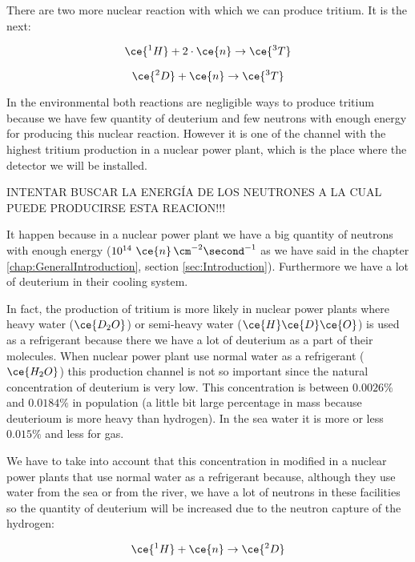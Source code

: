 There are two more nuclear reaction with which we can produce tritium. It is the next:

\begin{equation}
\ce{^{1}H} + 2 \cdot{} \ce{n} \rightarrow \ce{^{3}T}
\label{doblecapneuH}
\end{equation}

\begin{equation}
\ce{^{2}D} + \ce{n} \rightarrow \ce{^{3}T}
\label{capneuD}
\end{equation}

In the environmental both reactions are negligible ways to produce tritium because we have few quantity of deuterium and few neutrons with enough energy for producing this nuclear reaction. However it is one of the channel with the highest tritium production in a nuclear power plant, which is the place where the detector we will be installed.

INTENTAR BUSCAR LA ENERGÍA DE LOS NEUTRONES A LA CUAL PUEDE PRODUCIRSE ESTA REACION!!!

It happen because in a nuclear power plant we have a big quantity of neutrons with enough energy ($10^{14} ~\ce{n} \, \cm^{-2} \second^{-1}$ as we have said in the chapter \ref{chap:GeneralIntroduction}, section \ref{sec:Introduction}). Furthermore we have a lot of deuterium in their cooling system.

In fact, the production of tritium is more likely in nuclear power plants where heavy water ($\ce{D_2 O}$) or semi-heavy water ($\ce{H}\ce{D}\ce{O}$) is used as a refrigerant because there we have a lot of deuterium as a part of their molecules. When nuclear power plant use normal water as a refrigerant ($\ce{H_2 O}$) this production channel is not so important since the natural concentration of deuterium is very low. This concentration is between $0.0026\%$ and $0.0184\%$ in population (a little bit large percentage in mass because deuterioum is more heavy than hydrogen). In the sea water it is more or less $0.015\%$ and less for gas.

We have to take into account that this concentration in modified in a nuclear power plants that use normal water as a refrigerant because, although they use water from the sea or from the river, we have a lot of neutrons in these facilities so the quantity of deuterium will be increased due to the neutron capture of the hydrogen:

\begin{equation}
\ce{^{1}H} + \ce{n} \rightarrow \ce{^{2}D}
\label{capneuH}
\end{equation} 

